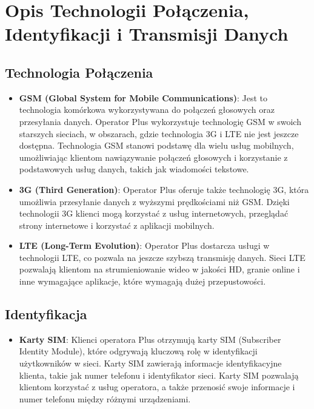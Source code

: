 \section{Opis Technologii Połączenia, Identyfikacji i Transmisji Danych}

\subsection{Technologia Połączenia}
\begin{itemize}
    \item \textbf{GSM (Global System for Mobile Communications)}: Jest to technologia komórkowa wykorzystywana do połączeń głosowych oraz przesyłania danych. Operator Plus wykorzystuje technologię GSM w swoich starszych sieciach, w obszarach, gdzie technologia 3G i LTE nie jest jeszcze dostępna. Technologia GSM stanowi podstawę dla wielu usług mobilnych, umożliwiając klientom nawiązywanie połączeń głosowych i korzystanie z podstawowych usług danych, takich jak wiadomości tekstowe.

    \item \textbf{3G (Third Generation)}: Operator Plus oferuje także technologię 3G, która umożliwia przesyłanie danych z wyższymi prędkościami niż GSM. Dzięki technologii 3G klienci mogą korzystać z usług internetowych, przeglądać strony internetowe i korzystać z aplikacji mobilnych.

    \item \textbf{LTE (Long-Term Evolution)}: Operator Plus dostarcza usługi w technologii LTE, co pozwala na jeszcze szybszą transmisję danych. Sieci LTE pozwalają klientom na strumieniowanie wideo w jakości HD, granie online i inne wymagające aplikacje, które wymagają dużej przepustowości.

\end{itemize}

\subsection{Identyfikacja}
\begin{itemize}
    \item \textbf{Karty SIM}: Klienci operatora Plus otrzymują karty SIM (Subscriber Identity Module), które odgrywają kluczową rolę w identyfikacji użytkowników w sieci. Karty SIM zawierają informacje identyfikacyjne klienta, takie jak numer telefonu i identyfikator sieci. Karty SIM pozwalają klientom korzystać z usług operatora, a także przenosić swoje informacje i numer telefonu między różnymi urządzeniami.

\end{itemize}

